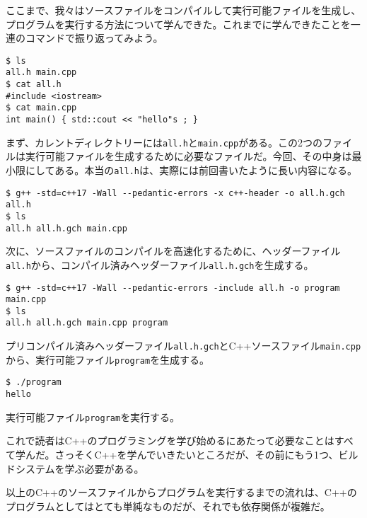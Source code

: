
ここまで、我々はソースファイルをコンパイルして実行可能ファイルを生成し、プログラムを実行する方法について学んできた。これまでに学んできたことを一連のコマンドで振り返ってみよう。

\begin{lstlisting}[style=terminal]
$ ls
all.h main.cpp
$ cat all.h
#include <iostream>
$ cat main.cpp
int main() { std::cout << "hello"s ; }
\end{lstlisting}

まず、カレントディレクトリーには\texttt{all.h}と\texttt{main.cpp}がある。この2つのファイルは実行可能ファイルを生成するために必要なファイルだ。今回、その中身は最小限にしてある。本当の\texttt{all.h}は、実際には前回書いたように長い内容になる。

\begin{lstlisting}[style=terminal]
$ g++ -std=c++17 -Wall --pedantic-errors -x c++-header -o all.h.gch all.h
$ ls
all.h all.h.gch main.cpp
\end{lstlisting}

次に、ソースファイルのコンパイルを高速化するために、ヘッダーファイル\texttt{all.h}から、コンパイル済みヘッダーファイル\texttt{all.h.gch}を生成する。

\begin{lstlisting}[style=terminal]
$ g++ -std=c++17 -Wall --pedantic-errors -include all.h -o program main.cpp
$ ls
all.h all.h.gch main.cpp program
\end{lstlisting}

プリコンパイル済みヘッダーファイル\texttt{all.h.gch}とC++ソースファイル\texttt{main.cpp}から、実行可能ファイル\texttt{program}を生成する。

\begin{lstlisting}[style=terminal]
$ ./program
hello
\end{lstlisting}

実行可能ファイル\texttt{program}を実行する。

これで読者はC++のプログラミングを学び始めるにあたって必要なことはすべて学んだ。さっそくC++を学んでいきたいところだが、その前にもう1つ、ビルドシステムを学ぶ必要がある。


以上のC++のソースファイルからプログラムを実行するまでの流れは、C++のプログラムとしてはとても単純なものだが、それでも依存関係が複雑だ。

